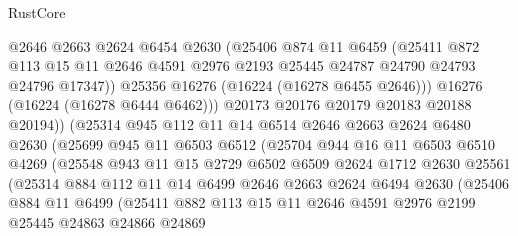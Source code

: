 \begin{lexlean}{RustCore}
\begin{coremodule}
                    @2646
                    @2663
                    @2624
                    @6454
                    @2630
                    (@25406
                      @874
                      @11
                      @6459
                      (@25411
                        @872
                        @113
                        @15
                        @11
                        @2646
                        @4591
                        @2976
                        @2193
                        @25445
                        @24787
                        @24790
                        @24793
                        @24796
                        @17347))
                    @25356
                    @16276
                    (@16224 (@16278 @6455 @2646)))
                  @16276
                  (@16224 (@16278 @6444 @6462)))
                @20173
                @20176
                @20179
                @20183
                @20188
                @20194))
            (@25314
              @945
              @112
              @11
              @14
              @6514
              @2646
              @2663
              @2624
              @6480
              @2630
              (@25699
                @945
                @11
                @6503
                @6512
                (@25704
                  @944
                  @16
                  @11
                  @6503
                  @6510
                  @4269
                  (@25548
                    @943
                    @11
                    @15
                    @2729
                    @6502
                    @6509
                    @2624
                    @1712
                    @2630
                    @25561
                    (@25314
                      @884
                      @112
                      @11
                      @14
                      @6499
                      @2646
                      @2663
                      @2624
                      @6494
                      @2630
                      (@25406
                        @884
                        @11
                        @6499
                        (@25411
                          @882
                          @113
                          @15
                          @11
                          @2646
                          @4591
                          @2976
                          @2199
                          @25445
                          @24863
                          @24866
                          @24869

\end{coremodule}
\end{lexlean}
